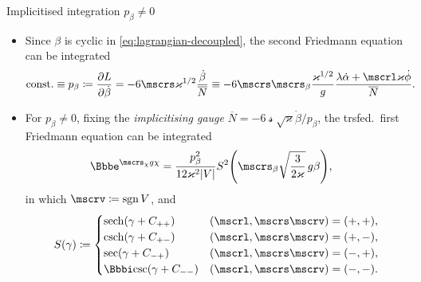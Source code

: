 \documentclass[9pt]{beamer}
\begin{document}
\begin{frame}%
{Implicitised integration}%
{$p_\beta \neq 0$}
\begin{itemize}
\item Since $\beta$ is cyclic in \cref{eq:lagrangian-decoupled},
the second Friedmann equation can be integrated
\begin{align}
\text{const.} \equiv p_\beta \coloneqq \frpa{L}{\dot{\beta}} &=
-6\mscrs\varkappa^{1/2}\frac{\dot{\beta}}{\overline{N}}
\equiv
-6\mscrs\mscrs_\beta\frac{\varkappa^{1/2}}{g}
\frac{\lambda\dot{\alpha}+\mscrl\varkappa\dot{\phi}}{\overline{N}}.
\end{align}

\item For $p_\beta \neq 0$, fixing the \emph{implicitising gauge}
$\overline{N} = -6\mscrs\sqrt{\varkappa}\dot{\beta}/p_\beta$, the trsfed.\
first Friedmann equation can be integrated
\begin{align}
\ee^{\mscrs_\chi g\chi} &=
\frac{p_\beta^2}{12\varkappa^2\vbr{V}}
\rfun{S^2}{\mscrs_\beta \sqrt{\frac{3}{2\varkappa}}\,g \beta},
\end{align}
in which $\mscrv \coloneqq \sgn V$, and
\begin{align}
\rfun{S}{\gamma} \coloneqq
\begin{cases}
\rfun{\sech}{\gamma+C_{++}} & \rbr{\mscrl, \mscrs\mscrv} = \rbr{+,+}, \\
\rfun{\csch}{\gamma+C_{+-}} & \rbr{\mscrl, \mscrs\mscrv} = \rbr{+,-}, \\
\rfun{\sec}{\gamma+C_{-+}} & \rbr{\mscrl, \mscrs\mscrv} = \rbr{-,+}, \\
\ii\rfun{\csc}{\gamma+C_{--}} & \rbr{\mscrl, \mscrs\mscrv} = \rbr{-,-}. \\
\end{cases}
\end{align}
\end{itemize}
\end{frame}
\end{document}
